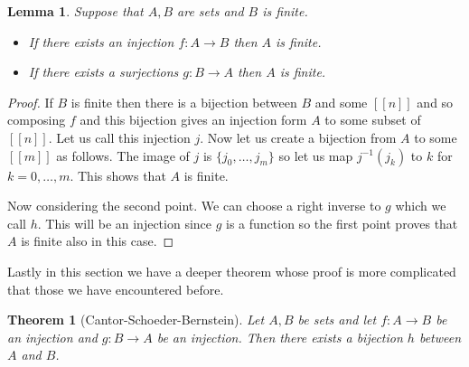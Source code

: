 \documentclass[
]{book}
\newtheorem{theorem}{Theorem}[chapter]
\newtheorem{lemma}{Lemma}[chapter]
\theoremstyle{definition}
\theoremstyle{definition}
\theoremstyle{definition}
\theoremstyle{definition}
\theoremstyle{remark}
\begin{document}
\begin{lemma}

Suppose that \(A,B\) are sets and \(B\) is finite.

\begin{itemize}
\item
  If there exists an injection \(f: A \rightarrow B\) then \(A\) is finite.
\item
  If there exists a surjections \(g: B \rightarrow A\) then \(A\) is finite.
\end{itemize}

\end{lemma}

\begin{proof}
If \(B\) is finite then there is a bijection between \(B\) and some \([[n]]\) and so composing \(f\) and this bijection gives an injection form \(A\) to some subset of \([[n]]\). Let us call this injection \(j\). Now let us create a bijection from \(A\) to some \([[m]]\) as follows. The image of \(j\) is \(\{j_0, \dots, j_m\}\) so let us map \(j^{-1}(j_k)\) to \(k\) for \(k=0,\dots, m\). This shows that \(A\) is finite.

Now considering the second point. We can choose a right inverse to \(g\) which we call \(h\). This will be an injection since \(g\) is a function so the first point proves that \(A\) is finite also in this case.
\end{proof}

Lastly in this section we have a deeper theorem whose proof is more complicated that those we have encountered before.

\begin{theorem}[Cantor-Schoeder-Bernstein]
Let \(A, B\) be sets and let \(f: A \rightarrow B\) be an injection and \(g: B \rightarrow A\) be an injection. Then there exists a bijection \(h\) between \(A\) and \(B\).
\end{theorem}
\end{document}
